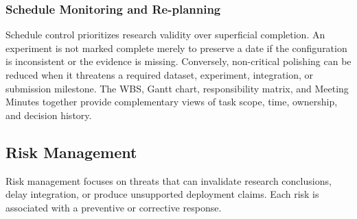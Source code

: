 \subsubsection{Schedule Monitoring and Re-planning}
Schedule control prioritizes research validity over superficial completion. An experiment is not marked complete merely to preserve a date if the configuration is inconsistent or the evidence is missing. Conversely, non-critical polishing can be reduced when it threatens a required dataset, experiment, integration, or submission milestone. The WBS, Gantt chart, responsibility matrix, and Meeting Minutes together provide complementary views of task scope, time, ownership, and decision history.\par
\subsection{Risk Management}
Risk management focuses on threats that can invalidate research conclusions, delay integration, or produce unsupported deployment claims. Each risk is associated with a preventive or corrective response.\par
\begingroup
\CVioTableSetup
\scriptsize

